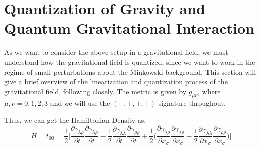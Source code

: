 \documentclass[11pt]{article}
\newcommand{\munu}{\mu\nu}
\begin{document}
\section{Quantization of Gravity and Quantum Gravitational Interaction}
As we want to consider the above setup in a gravitational field, we must understand how the gravitational field is quantized, since we want to work in the regime of small perturbations about the Minkowski background. This section will give a brief overview of the linearization and quantization process of the gravitational field, following \citet{Gupta_1952} closely. The metric is given by $g_{\munu}$, where $\mu, \nu = 0, 1, 2, 3$ and we will use the $(-, +, +, +)$ signature throughout.

Thus, we can get the Hamiltonian Density as,
\begin{equation}
    H = t_{00} = \frac{1}{2}\Bigg[\frac{\partial\gamma_{\lambda\rho}}{\partial t}\frac{\partial\gamma_{\lambda\rho}}{\partial t} - \frac{1}{2}\frac{\partial\gamma_{\lambda\lambda}}{\partial t}\frac{\partial\gamma_{\rho\rho}}{\partial t} + \frac{1}{2}\Bigg(\frac{\partial\gamma_{\lambda\rho}}{\partial x_{\sigma}}\frac{\partial\gamma_{\lambda\rho}}{\partial x_{\sigma}} - \frac{1}{2}\frac{\partial\gamma_{\lambda\lambda}}{\partial x_{\sigma}}\frac{\partial\gamma_{\rho\rho}}{\partial x_{\sigma}}\Bigg)\Bigg]
\end{equation}
\end{document}
